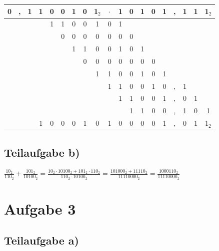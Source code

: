 \documentclass{llncs}
\begin{document}
\begin{tabular}{ccccccccccccccccccc}
0&,&1&1&0&0&1&0&1$_2$&$\cdot$&1&0&1&0&1&,&1&1&1$_2$\\
\hline
 & & & &1&1&0&0&1&0      &1& & & & & & & & \\
 & & & & &0&0&0&0&0      &0&0& & & & & & & \\
 & & & & & &1&1&0&0      &1&0&1& & & & & & \\
 & & & & & & &0&0&0      &0&0&0&0& & & & & \\
 & & & & & & & &1&1      &0&0&1&0&1& & & & \\
 & & & & & & & & &1      &1&0&0&1&0&,&1& & \\
 & & & & & & & & &       &1&1&0&0&1&,&0&1& \\
 & & & & & & & & &       & &1&1&0&0&,&1&0&1\\
\hline
 & & &1&0&0&0&1&0&1      &0&0&0&0&1&,&0&1&1$_2$\\
\end{tabular}

\subsection*{Teilaufgabe b)}

$\frac{10_2}{110_2} + \frac{101_2}{10100_2} = \frac{10_2 \cdot 10100_2 + 101_2 \cdot 110_2}{110_2 \cdot 10100_2} = \frac{101000_2 + 11110_2}{11110000_2} = \frac{1000110_2}{11110000_2}$
\newpage

\section*{Aufgabe 3}

\subsection*{Teilaufgabe a)}
\end{document}
